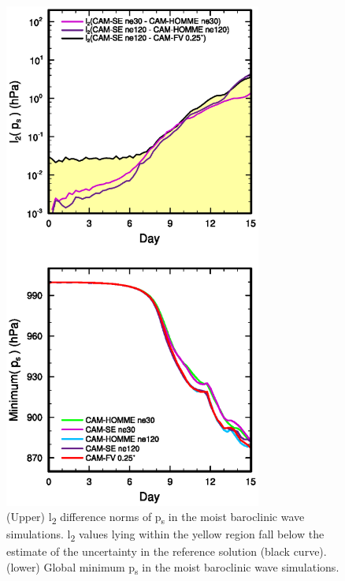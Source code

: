 \begin{figure}[x]
\centering
\includegraphics[width=20pc]{figs/temp_l2_reference.eps}
\caption{(Upper) l\textsubscript{2} difference norms of p\textsubscript{s} in the moist baroclinic wave simulations. l\textsubscript{2} values lying within the yellow region fall below the estimate of the uncertainty in the reference solution (black curve). (lower) Global minimum p\textsubscript{s} in the moist baroclinic wave simulations.}
\label{fig:l2norm}
\end{figure}
